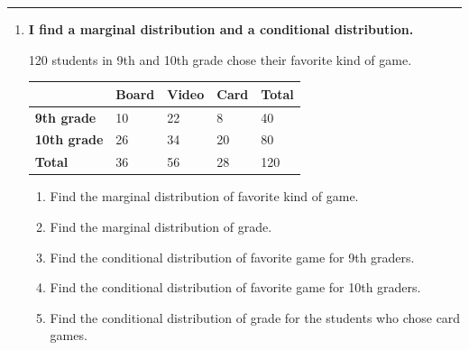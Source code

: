 \documentclass[11pt]{article}
\newcommand{\lessonhead}[1]{\par\vspace{0.6em}{\large\bfseries #1}\par\vspace{0.25em}\hrule\vspace{0.6em}}
\newcommand{\goal}[1]{\textbf{#1}\par\vspace{0.35em}}
\begin{document}
\newpage
\lessonhead{3.2 - Marginal and Conditional Distributions}
\begin{enumerate}[resume]

\item \goal{I find a marginal distribution and a conditional distribution.}
120 students in 9th and 10th grade chose their favorite kind of game.
\begin{center}
\renewcommand{\arraystretch}{1.5}
\begin{tabular}{|l|C{0.8in}|C{0.8in}|C{0.8in}|C{0.8in}|}\hline
 & \textbf{Board} & \textbf{Video} & \textbf{Card} & \textbf{Total} \\ \hline
\textbf{9th grade} & 10 & 22 & 8 & 40 \\ \hline
\textbf{10th grade} & 26 & 34 & 20 & 80 \\ \hline
\textbf{Total} & 36 & 56 & 28 & 120 \\ \hline
\end{tabular}
\end{center}
\begin{enumerate}[itemsep=1.2em]
  \item Find the marginal distribution of favorite kind of game.

  \work{2.5em}
  \item Find the marginal distribution of grade.

  \work{2.5em}
  \item Find the conditional distribution of favorite game for 9th graders.

  \work{2.5em}
  \item Find the conditional distribution of favorite game for 10th graders.

  \work{2.5em}
  \item Find the conditional distribution of grade for the students who chose card games.

  \work{2.5em}
\end{enumerate}


\end{enumerate}
\end{document}
